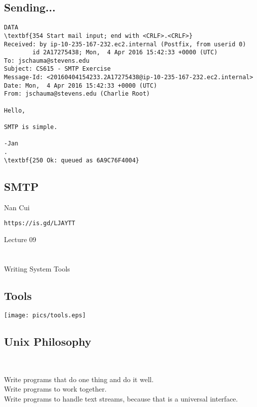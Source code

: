 \documentclass[xga]{xdvislides}
\begin{document}
\subsection{Sending...}
\begin{Verbatim}
DATA
\textbf{354 Start mail input; end with <CRLF>.<CRLF>}
Received: by ip-10-235-167-232.ec2.internal (Postfix, from userid 0)
        id 2A17275438; Mon,  4 Apr 2016 15:42:33 +0000 (UTC)
To: jschauma@stevens.edu
Subject: CS615 - SMTP Exercise
Message-Id: <20160404154233.2A17275438@ip-10-235-167-232.ec2.internal>
Date: Mon,  4 Apr 2016 15:42:33 +0000 (UTC)
From: jschauma@stevens.edu (Charlie Root)

Hello,

SMTP is simple.

-Jan
.
\textbf{250 Ok: queued as 6A9C76F4004}
\end{Verbatim}

\subsection{SMTP}
Nan Cui\\
\vspace{1in}

\verb+https://is.gd/LJAYTT+


\newpage
\vspace*{\fill}
\begin{center}
    \Hugesize
        Lecture 09 \\ [1em]
    \hspace*{5mm}
    \blueline\\
    \hspace*{5mm}\\
	Writing System Tools
\end{center}
\vspace*{\fill}

\subsection{Tools}
\vspace*{\fill}
\begin{center}
	\texttt{[image: pics/tools.eps]}
\end{center}
\vspace*{\fill}

\subsection{Unix Philosophy}
\\
\Huge
\begin{center}
	Write programs that do one thing and do it well.\\
	\vspace{.5in}
	Write programs to work together. \\
	\vspace{.5in}
	Write programs to handle text streams, because that is a universal interface.
\end{center}
\Normalsize
\end{document}
